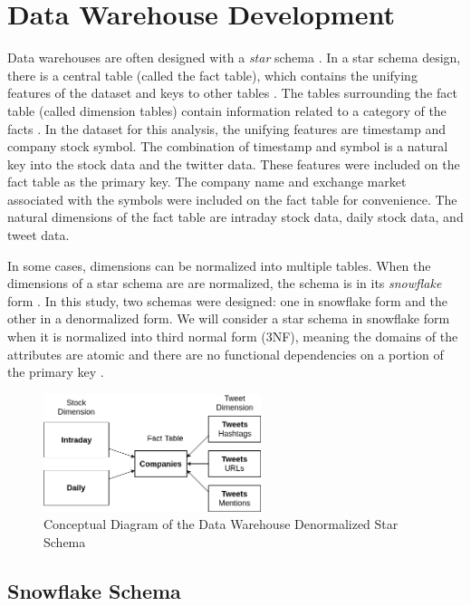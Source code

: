 \documentclass[journal]{IEEEtran}
\begin{document}
\section{Data Warehouse Development}
\label{DataWarehouseDevelopment}

Data warehouses are often designed with a \textit{star} schema 
 \cite{BuildingtheDWCH11}.
In a star schema design, there is a central table (called the fact table),
 which contains the unifying features of the dataset and keys to other tables
 \cite{BuildingtheDWCH11}.
The tables surrounding the fact table (called dimension tables) 
 contain information related to a category of the facts \cite{Enterprise}.
In the dataset for this analysis, the unifying features are timestamp and
 company stock symbol.
The combination of timestamp and symbol is a natural key into the stock data and
 the twitter data.
These features were included on the fact table as the primary key.
The company name and exchange market associated with the symbols were 
 included on the fact table for convenience.
The natural dimensions of the fact table are intraday stock data,
 daily stock data, and tweet data.

In some cases, dimensions can be normalized into multiple tables. 
When the dimensions of a star schema are are normalized, the schema
 is in its \textit{snowflake} form \cite{WarehouseDesignApproaches}.
In this study, two schemas were designed: one in snowflake form and
 the other in a denormalized form.
We will consider a star schema in snowflake form when it is normalized into
 third normal form (3NF), meaning the domains of the attributes are atomic and
 there are no functional dependencies on a portion of the primary key \cite{DSCNormalization}.


\begin{figure}
	\centering
	\includegraphics[width=2.5in]{Star_Schema_Simple.png}
	\caption{Conceptual Diagram of the Data Warehouse 
		Denormalized Star Schema}
	\label{star}
\end{figure}

\subsection{Snowflake Schema}
\end{document}
